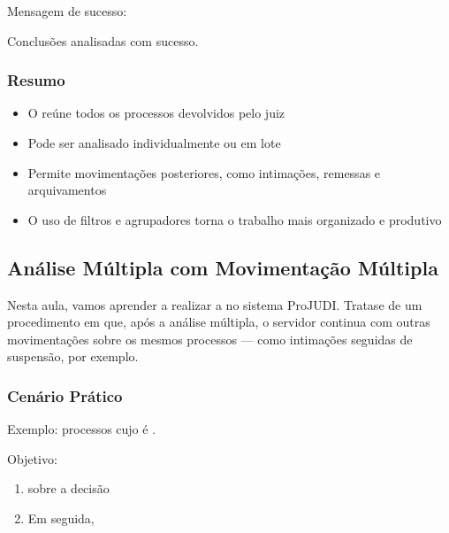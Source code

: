 \documentclass[letterpaper,10pt,brazil]{sphinxmanual}
\begin{document}
\sphinxAtStartPar
Mensagem de sucesso:

\sphinxAtStartPar
Conclusões analisadas com sucesso.


\subsubsection{Resumo}
\label{\detokenize{projud_07_analisejuntada_multiplaeunitariaconclusos:resumo}}\begin{itemize}
\item {} 
\sphinxAtStartPar
O  reúne todos os processos devolvidos pelo juiz

\item {} 
\sphinxAtStartPar
Pode ser analisado individualmente ou em lote

\item {} 
\sphinxAtStartPar
Permite movimentações posteriores, como intimações, remessas e arquivamentos

\item {} 
\sphinxAtStartPar
O uso de filtros e agrupadores torna o trabalho mais organizado e produtivo

\end{itemize}

\sphinxstepscope


\subsection{Análise Múltipla com Movimentação Múltipla}
\label{\detokenize{projud_08_multiplaeunitariamov:analise-multipla-com-movimentacao-multipla}}\label{\detokenize{projud_08_multiplaeunitariamov::doc}}
\sphinxAtStartPar
Nesta aula, vamos aprender a realizar a  no sistema ProJUDI. Trata\sphinxhyphen{}se de um procedimento em que, após a análise múltipla, o servidor continua com outras movimentações sobre os mesmos processos — como intimações seguidas de suspensão, por exemplo.


\subsubsection{Cenário Prático}
\label{\detokenize{projud_08_multiplaeunitariamov:cenario-pratico}}
\sphinxAtStartPar
Exemplo: processos cujo  é .

\sphinxAtStartPar
Objetivo:
\begin{enumerate}
%
\item {} 
\sphinxAtStartPar
{} sobre a decisão

\item {} 
\sphinxAtStartPar
Em seguida, 

\end{enumerate}
\end{document}
